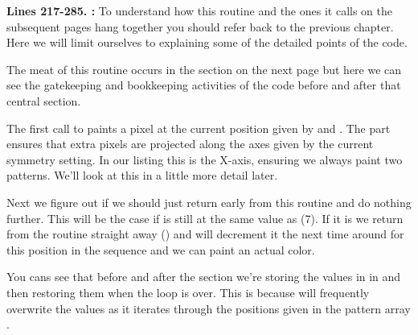 \textbf{Lines 217-285. :} To understand how this routine and the ones it calls on the subsequent pages hang together you should refer
back to the previous chapter. Here we will limit ourselves to explaining some of the detailed points of the
code.

The meat of this routine occurs in the  section on the next page but here we can see the
gatekeeping and bookkeeping activities of the code before and after that central section. 

The first call to  paints a pixel at the current position given by 
 and . The  part ensures that extra
pixels are projected along the axes given by the current symmetry setting. In our listing this is the
X-axis, ensuring we always paint two patterns. We'll look at this in a little more detail later.

Next we figure out if we should just return early from this routine and do nothing further. This will be the
case if  is still at the same value as  (7). If it is
we return from the routine straight away () and
 will decrement it the next time around for this position
in the sequence and we can paint an actual color.

You cans see that before and after the  section we're storing the values in  in
 and then restoring them when the loop is over. This is because 
will frequently overwrite the values as it iterates through the positions given in the pattern array .

